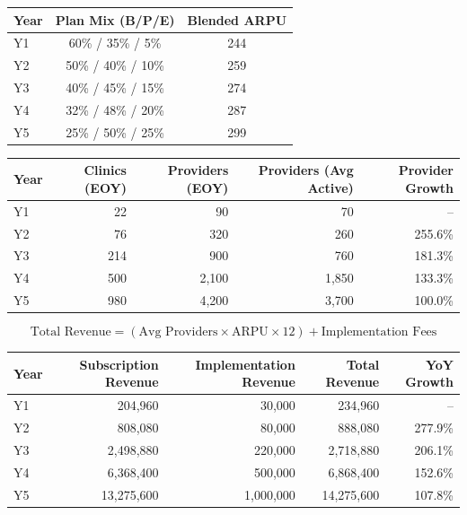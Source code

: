 \documentclass[11pt]{article}
\begin{document}
\begin{center}
\begin{tabular}{lcc}
\toprule
\textbf{Year} & \textbf{Plan Mix (B/P/E)} & \textbf{Blended ARPU} \\
\midrule
Y1 & 60\% / 35\% / 5\% & 244 \\
Y2 & 50\% / 40\% / 10\% & 259 \\
Y3 & 40\% / 45\% / 15\% & 274 \\
Y4 & 32\% / 48\% / 20\% & 287 \\
Y5 & 25\% / 50\% / 25\% & 299 \\
\bottomrule
\end{tabular}
\end{center}

\begin{center}
\begin{tabular}{lrrrr}
\toprule
\textbf{Year} & \textbf{Clinics (EOY)} & \textbf{Providers (EOY)} & \textbf{Providers (Avg Active)} & \textbf{Provider Growth} \\
\midrule
Y1 & 22 & 90 & 70 & -- \\
Y2 & 76 & 320 & 260 & 255.6\% \\
Y3 & 214 & 900 & 760 & 181.3\% \\
Y4 & 500 & 2,100 & 1,850 & 133.3\% \\
Y5 & 980 & 4,200 & 3,700 & 100.0\% \\
\bottomrule
\end{tabular}
\end{center}

\[
\text{Total Revenue} = (\text{Avg Providers}\times\text{ARPU}\times12) + \text{Implementation Fees}
\]

\begin{center}
\begin{tabular}{lrrrr}
\toprule
\textbf{Year} & \textbf{Subscription Revenue} & \textbf{Implementation Revenue} & \textbf{Total Revenue} & \textbf{YoY Growth} \\
\midrule
Y1 & 204,960 & 30,000 & 234,960 & -- \\
Y2 & 808,080 & 80,000 & 888,080 & 277.9\% \\
Y3 & 2,498,880 & 220,000 & 2,718,880 & 206.1\% \\
Y4 & 6,368,400 & 500,000 & 6,868,400 & 152.6\% \\
Y5 & 13,275,600 & 1,000,000 & 14,275,600 & 107.8\% \\
\bottomrule
\end{tabular}
\end{center}
\end{document}
